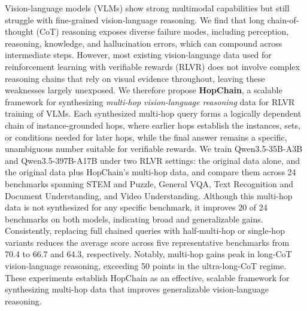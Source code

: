 Vision-language models (VLMs) show strong multimodal capabilities but still struggle with fine-grained vision-language reasoning.
We find that long chain-of-thought (CoT) reasoning exposes diverse failure modes, including perception, reasoning, knowledge, and hallucination errors, which can compound across intermediate steps.
However, most existing vision-language data used for reinforcement learning with verifiable rewards (RLVR) does not involve complex reasoning chains that rely on visual evidence throughout, leaving these weaknesses largely unexposed.
We therefore propose \textbf{HopChain}, a scalable framework for synthesizing \emph{multi-hop vision-language reasoning} data for RLVR training of VLMs.
Each synthesized multi-hop query forms a logically dependent chain of instance-grounded hops, where earlier hops establish the instances, sets, or conditions needed for later hops, while the final answer remains a specific, unambiguous number suitable for verifiable rewards.
We train Qwen3.5-35B-A3B and Qwen3.5-397B-A17B under two RLVR settings: the original data alone, and the original data plus HopChain's multi-hop data, and compare them across 24 benchmarks spanning STEM and Puzzle, General VQA, Text Recognition and Document Understanding, and Video Understanding.
Although this multi-hop data is not synthesized for any specific benchmark, it improves 20 of 24 benchmarks on both models, indicating broad and generalizable gains.
Consistently, replacing full chained queries with half-multi-hop or single-hop variants reduces the average score across five representative benchmarks from 70.4 to 66.7 and 64.3, respectively.
Notably, multi-hop gains peak in long-CoT vision-language reasoning, exceeding 50 points in the ultra-long-CoT regime.
These experiments establish HopChain as an effective, scalable framework for synthesizing multi-hop data that improves generalizable vision-language reasoning.
